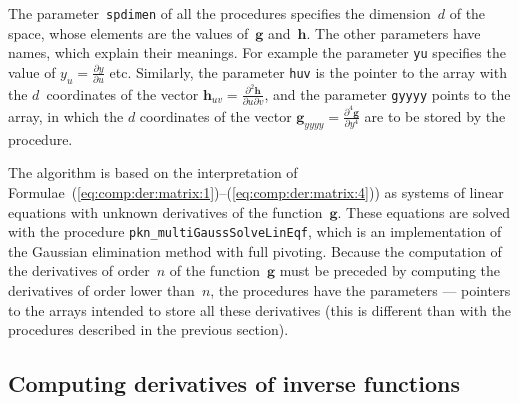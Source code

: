The parameter~\texttt{spdimen} of all the procedures specifies the dimension~$d$
of the space, whose elements are the values of~$\bm{g}$ and~$\bm{h}$.
The other parameters have names, which explain their meanings.
For example the parameter \texttt{yu} specifies the value of
$y_u=\frac{\partial y}{\partial u}$ etc. Similarly, the parameter \texttt{huv}
is the pointer to the array with the $d$~coordinates of the vector
$\bm{h}_{uv}=\frac{\partial^2\bm{h}}{\partial u\partial v}$, and the
parameter \texttt{gyyyy} points to the array, in which the $d$ coordinates
of the vector $\bm{g}_{yyyy}=\frac{\partial^4\bm{g}}{\partial y^4}$ are
to be stored by the procedure.

The algorithm is based on the interpretation of
Formulae~(\ref{eq:comp:der:matrix:1})--(\ref{eq:comp:der:matrix:4})) as
systems of linear equations with unknown derivatives of the function~$\bm{g}$.
These equations are solved with the procedure
\texttt{pkn\_multiGaussSolveLinEqf}, which is an implementation of
the Gaussian elimination method with full pivoting.
Because the computation of the derivatives of order~$n$ of the function~$\bm{g}$
must be preceded by computing the derivatives of order lower than~$n$,
the procedures have the parameters --- pointers to the arrays intended
to store all these derivatives (this is different than with the procedures
described in the previous section).


\subsection{Computing derivatives of inverse functions}

